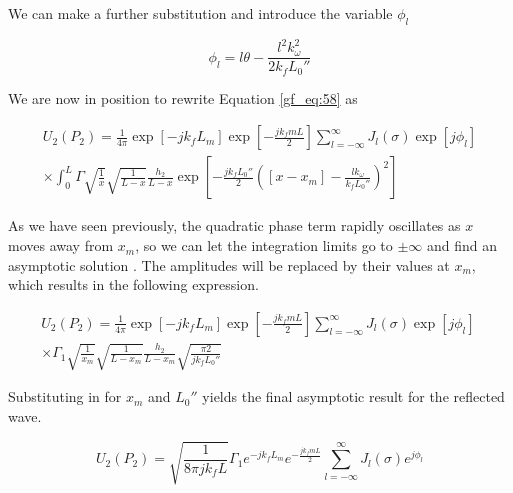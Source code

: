 \noindent We can make a further substitution and introduce the variable $\phi_l$

\begin{equation}
\phi_l = l\theta - \frac{l^2k_{\omega}^2}{2k_fL_0''}
\label{gf_eq:101}
\end{equation}
\renewcommand{\baselinestretch}{2} \small\normalsize

\noindent We are now in position to rewrite Equation \ref{gf_eq:58} as

\begin{equation}
\begin{gathered}
U_2(P_2) = \frac{1}{4\pi} \exp[-jk_fL_m] \exp\left[-\frac{jk_fmL}{2}\right]\sum_{l=-\infty}^{\infty}J_l(\sigma)\exp\left[j\phi_l\right] \\
\times \int_0^L  \Gamma \sqrt{\frac{1}{x}}\sqrt{\frac{1}{L-x}}\frac{h_2}{L-x}\exp\left[-\frac{jk_fL_0''}{2}\left([x-x_m]-\frac{lk_{\omega}}{k_fL_0''} \right)^2\right]
\label{gf_eq:102}
\end{gathered}
\end{equation}
\renewcommand{\baselinestretch}{2} \small\normalsize

As we have seen previously, the quadratic phase term rapidly oscillates as $x$ moves away from $x_m$, so we can let the integration limits go to $\pm \infty$ and find an asymptotic solution \cite{cheng_analytic_methods}. The amplitudes will be replaced by their values at $x_m$, which results in the following expression.

\begin{equation}
\begin{gathered}
U_2(P_2) = \frac{1}{4\pi} \exp[-jk_fL_m] \exp\left[-\frac{jk_fmL}{2}\right] \sum_{l=-\infty}^{\infty}J_l(\sigma)\exp\left[j\phi_l\right]\  \\
\times \Gamma_1 \sqrt{\frac{1}{x_m}}\sqrt{\frac{1}{L-x_m}}\frac{h_2}{L-x_m}\sqrt{\frac{\pi 2}{jk_fL_0''}}
\label{gf_eq:72}
\end{gathered}
\end{equation}
\renewcommand{\baselinestretch}{2} \small\normalsize

\noindent Substituting in for $x_m$ and $L_0''$ yields the final asymptotic result for the reflected wave.

\begin{equation}
U_2(P_2) = \sqrt{\frac{1}{8\pi jk_f L}}\Gamma_1e^{-jk_fL_m} e^{-\frac{jk_fmL}{2}} \sum_{l=-\infty}^{\infty}J_l(\sigma)e^{j\phi_l}
\label{gf_eq:73}
\end{equation}
\renewcommand{\baselinestretch}{2} \small\normalsize

